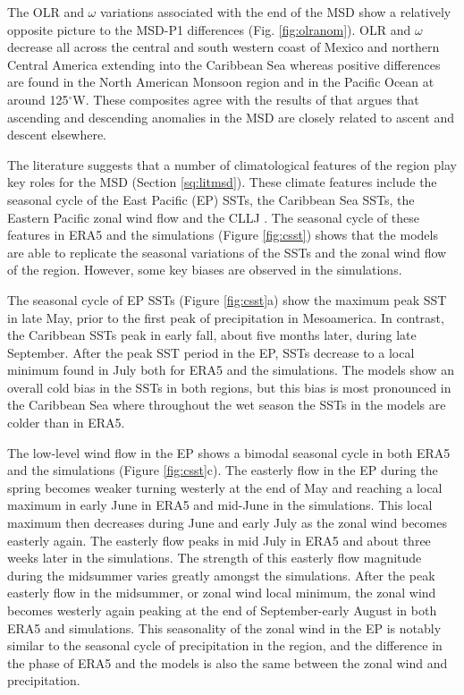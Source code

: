  
 The OLR and $\omega$ variations associated with the end of the MSD show a relatively opposite picture to the MSD-P1 differences (Fig. \ref{fig:olranom}). OLR and $\omega$ decrease all across the central and south western coast of Mexico and northern Central America extending into the Caribbean Sea whereas positive differences are found in the North American Monsoon region and in the Pacific Ocean at around 125$^\circ$W.  These composites agree with the results of \cite{herrera2015} that argues that ascending and descending anomalies in the MSD are closely related to ascent and descent elsewhere.

The literature suggests that a number of climatological features of the region play key roles for the MSD (Section \ref{sq:litmsd}). These climate features include the seasonal cycle of the East Pacific (EP) SSTs, the Caribbean Sea SSTs, the Eastern Pacific zonal wind flow and the CLLJ \citep{magana1999,amador2008,herrera2015,straffon2019,garcia2020sub}. 
The seasonal cycle of these features in ERA5 and the simulations (Figure \ref{fig:csst}) shows that the models are able to replicate the seasonal variations of the SSTs and the zonal wind flow of the region. However, some key biases are observed in the simulations.

The seasonal cycle of EP SSTs (Figure \ref{fig:csst}a) show the maximum peak SST in late May, prior to the first peak of precipitation in Mesoamerica. In contrast, the Caribbean SSTs peak in early fall, about five months later, during late September. After the peak SST period in the EP, SSTs decrease to a local minimum found in July both for ERA5 and the simulations. The models show an overall cold bias in the SSTs in both regions, but this bias is most pronounced in the Caribbean Sea where throughout the wet season the SSTs in the models are colder than in ERA5. 

 The low-level wind flow in the EP shows a bimodal seasonal cycle in both ERA5 and the simulations (Figure \ref{fig:csst}c).
The easterly flow in the EP during the spring becomes weaker turning westerly at the end of May and reaching a local maximum in early June in ERA5 and mid-June in the simulations. This local maximum then decreases during June and early July as the zonal wind becomes easterly again. The easterly flow peaks in mid July in ERA5 and about three weeks later in the simulations. The strength of this easterly flow magnitude during the midsummer varies greatly amongst the simulations. 
After the peak easterly flow in  the midsummer, or zonal wind local minimum, the zonal wind becomes westerly again peaking at the end of September-early August in both ERA5 and simulations. 
This seasonality of the zonal wind in the EP is notably similar to the seasonal cycle of precipitation in the region, and the difference in the phase of ERA5 and the models is also the same between the zonal wind and precipitation.

